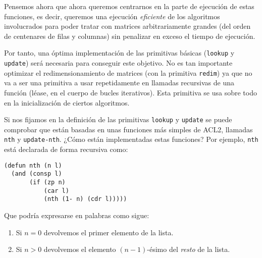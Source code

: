 \documentclass[a4paper,10pt]{article}
\begin{document}
\par \vspace{10pt}

Pensemos ahora que ahora queremos centrarnos en la parte de ejecución de estas funciones, es decir, queremos una ejecución \emph{eficiente} de los algoritmos involucrados para poder tratar con matrices arbitrariamente grandes (del orden de centenares de filas y columnas) sin penalizar en exceso el tiempo de ejecución.

\par \vspace{10pt}

Por tanto, una óptima implementación de las primitivas básicas (\texttt{lookup} y \texttt{update}) será necesaria para conseguir este objetivo. No es tan importante optimizar el redimensionamiento de matrices (con la primitiva \texttt{redim}) ya que no va a ser una primitiva a usar repetidamente en llamadas recursivas de una función (léase, en el cuerpo de bucles iterativos). Esta primitiva se usa sobre todo en la inicialización de ciertos algoritmos.

\par \vspace{10pt}

Si nos fijamos en la definición de las primitivas \texttt{lookup} y \texttt{update} se puede comprobar que están basadas en unas funciones más simples de ACL2, llamadas \texttt{nth} y \texttt{update-nth}. ¿Cómo están implementadas estas funciones? Por ejemplo, \texttt{nth} está declarada de forma recursiva como:

\par \vspace{10pt}

\begin{lstlisting}[language=clips]
(defun nth (n l)
  (and (consp l) 
       (if (zp n) 
           (car l) 
           (nth (1- n) (cdr l)))))
\end{lstlisting}

\par \vspace{10pt}

Que podría expresarse en palabras como sigue:

\par \vspace{10pt}

\begin{enumerate}
	\item Si $n=0$ devolvemos el primer elemento de la lista.
	\item Si $n>0$ devolvemos el elemento $(n-1)$-ésimo del \emph{resto} de la lista.
\end{enumerate}
\end{document}
